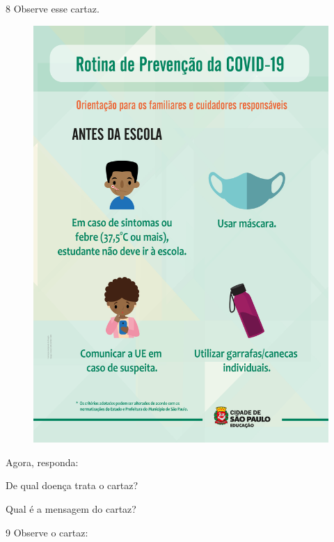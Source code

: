 \num{8} Observe esse cartaz.


\begin{figure}[H]
\centering
\includegraphics[width=.8\textwidth]{media/image192.jpg}
\end{figure}


Agora, responda:

\begin{escolha}
\item De qual doença trata o cartaz?\\

\item Qual é a mensagem do cartaz?\\
\end{escolha}

\num{9} Observe o cartaz:

